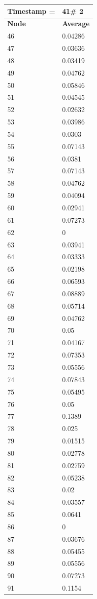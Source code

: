 \begin{tabular}{|l||l|}
\hline
\textbf{Timestamp =} & \textbf{41}\# 2\\\hline
	\textbf{Node} & \textbf{Average} \\ \hline
\hline
	46 & 0.04286 \\ \hline
	47 & 0.03636 \\ \hline
	48 & 0.03419 \\ \hline
	49 & 0.04762 \\ \hline
	50 & 0.05846 \\ \hline
	51 & 0.04545 \\ \hline
	52 & 0.02632 \\ \hline
	53 & 0.03986 \\ \hline
	54 & 0.0303 \\ \hline
	55 & 0.07143 \\ \hline
	56 & 0.0381 \\ \hline
	57 & 0.07143 \\ \hline
	58 & 0.04762 \\ \hline
	59 & 0.04094 \\ \hline
	60 & 0.02941 \\ \hline
	61 & 0.07273 \\ \hline
	62 & 0 \\ \hline
	63 & 0.03941 \\ \hline
	64 & 0.03333 \\ \hline
	65 & 0.02198 \\ \hline
	66 & 0.06593 \\ \hline
	67 & 0.08889 \\ \hline
	68 & 0.05714 \\ \hline
	69 & 0.04762 \\ \hline
	70 & 0.05 \\ \hline
	71 & 0.04167 \\ \hline
	72 & 0.07353 \\ \hline
	73 & 0.05556 \\ \hline
	74 & 0.07843 \\ \hline
	75 & 0.05495 \\ \hline
	76 & 0.05 \\ \hline
	77 & 0.1389 \\ \hline
	78 & 0.025 \\ \hline
	79 & 0.01515 \\ \hline
	80 & 0.02778 \\ \hline
	81 & 0.02759 \\ \hline
	82 & 0.05238 \\ \hline
	83 & 0.02 \\ \hline
	84 & 0.03557 \\ \hline
	85 & 0.0641 \\ \hline
	86 & 0 \\ \hline
	87 & 0.03676 \\ \hline
	88 & 0.05455 \\ \hline
	89 & 0.05556 \\ \hline
	90 & 0.07273 \\ \hline
	91 & 0.1154 \\ \hline
\end{tabular}
